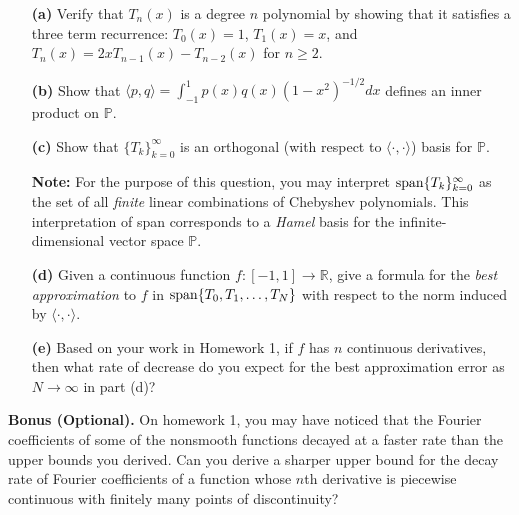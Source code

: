 \documentclass[12pt]{article}
\begin{document}
\begin{itemize}

	\item[\textbf{(a)}] Verify that $T_n(x)$ is a degree $n$ polynomial by showing that it satisfies a three term recurrence: $T_0(x)=1$, $T_1(x)=x$, and $T_n(x) = 2xT_{n-1}(x) - T_{n-2}(x)$ for $n\geq 2$. 

	\item[\textbf{(b)}] Show that $\langle p,q\rangle=\int_{-1}^1p(x)q(x)(1-x^2)^{-1/2}dx$ defines an inner product on $\mathbb{P}$. 

	\item[\textbf{(c)}] Show that $\{T_k\}_{k=0}^\infty$ is an orthogonal (with respect to $\langle\cdot,\cdot\rangle$) basis for $\mathbb{P}$.

\noindent
\textbf{Note:} For the purpose of this question, you may interpret ${\rm span}\{T_k\}_{k=0}^\infty$ as the set of all \textit{finite} linear combinations of Chebyshev polynomials. This interpretation of span corresponds to a \textit{Hamel} basis for the infinite-dimensional vector space $\mathbb{P}$.

	\item[\textbf{(d)}] Given a continuous function $f:[-1,1]\rightarrow\mathbb{R}$, give a formula for the \textit{best approximation} to $f$ in ${\rm span}\{T_0,T_1,\ldots,T_N\}$ with respect to the norm induced by $\langle\cdot,\cdot\rangle$.

	\item[\textbf{(e)}] Based on your work in Homework 1, if $f$ has $n$ continuous derivatives, then what rate of decrease do you expect for the best approximation error as $N\rightarrow\infty$ in part (d)?

\end{itemize}

\noindent
\textbf{Bonus (Optional).} On homework 1, you may have noticed that the Fourier coefficients of some of the nonsmooth functions decayed at a faster rate than the upper bounds you derived. Can you derive a sharper upper bound for the decay rate of Fourier coefficients of a function whose $n$th derivative is piecewise continuous with finitely many points of discontinuity? 
\end{document}
